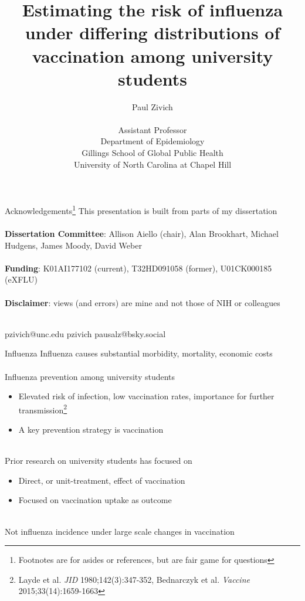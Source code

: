 \documentclass{beamer}
\title[Network-TMLE]{Estimating the risk of influenza under differing distributions of vaccination among university students}
\author[Paul Zivich]{Paul Zivich \\~\\ Assistant Professor \\ Department of Epidemiology \\ Gillings School of Global Public Health \\ University of North Carolina at Chapel Hill}
\begin{document}
	
\begin{frame}[plain]
	\maketitle
\end{frame}

\begin{frame}{Acknowledgements\footnote[frame]{Footnotes are for asides or references, but are fair game for questions}}
	This presentation is built from parts of my dissertation
	~\\~\\
	\textbf{Dissertation Committee}: Allison Aiello (chair), Alan Brookhart, Michael Hudgens, James Moody, David Weber \\~\\
	\textbf{Funding}: K01AI177102 (current), T32HD091058 (former), U01CK000185 (eXFLU) \\~\\
	\textbf{Disclaimer}: views (and errors) are mine and not those of NIH or colleagues \\~\\
	\begin{center}
		\small
		\faEnvelope \quad pzivich@unc.edu \qquad \quad 
		\faGithub \quad pzivich \qquad \quad
		pausalz@bsky.social
	\end{center}
\end{frame}

\begin{frame}{Influenza}
	Influenza causes substantial morbidity, mortality, economic costs 
	~\\~\\
	Influenza prevention among university students
	\begin{itemize}
		\item Elevated risk of infection, low vaccination rates, importance for further transmission\footnote[frame]{Layde et al. \textit{JID} 1980;142(3):347-352, Bednarczyk et al. \textit{Vaccine} 2015;33(14):1659-1663}
		\item A key prevention strategy is vaccination
	\end{itemize}
	~\\
	Prior research on university students has focused on
	\begin{itemize}
		\item Direct, or unit-treatment, effect of vaccination
		\item Focused on vaccination uptake as outcome
	\end{itemize}
	~\\
	Not influenza incidence under large scale changes in vaccination
\end{frame}
\end{document}
